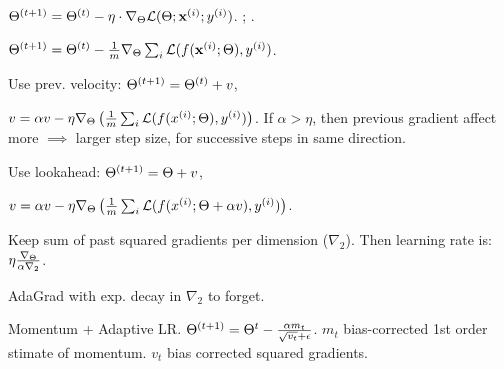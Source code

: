 \begin{definition}[SGD]
    \(\Theta^{(t+1)} = \Theta^{(t)} - \eta \cdot \nabla_\Theta \mathcal{L}(\Theta; \vb{x}^{(i)}; y^{(i)})\).
    ;
    .
\end{definition}

\begin{definition}[MB-GD]
    \(\Theta^{(t+1)} = \Theta^{(t)} - \frac 1 m \nabla_\Theta \sum_i \mathcal{L}(f(\vb{x}^{(i)}; \Theta), y^{(i)})\).
\end{definition}

\begin{definition}
    Use prev. velocity:
    \(\Theta^{(t+1)} = \Theta^{(t)} + v\), 
    
    \(v = \alpha v - \eta \nabla_\Theta\left(\frac 1 m \sum_i \mathcal{L}(f(x^{(i)}; \Theta), y^{(i)})\right)\). If \(\alpha > \eta\), then previous gradient affect more \(\implies\) larger step size, for successive steps in same direction.
\end{definition}

\begin{definition}
    Use lookahead:
    \(\Theta^{(t+1)} = \Theta + v\),
    
    \(v = \alpha v - \eta \nabla_\Theta\left(\frac 1 m \sum_i \mathcal{L}(f(x^{(i)}; \Theta + \alpha v), y^{(i)})\right)\).
\end{definition}

\begin{definition}[AdaGrad]
    Keep sum of past squared gradients per dimension (\(\nabla_2\)).
    Then learning rate is: \(\eta \frac{\nabla_\Theta}{\alpha \nabla_2} \).
\end{definition}

\begin{definition}[RMSprop]
    AdaGrad with exp. decay in \(\nabla_2\) to forget. 
\end{definition}

\begin{definition}[Adam]
    Momentum + Adaptive LR. \(\Theta^{(t+1)} = \Theta^t - \frac{\alpha m_t}{\sqrt{v_t} + \epsilon}\). \(m_t\) bias-corrected 1st order stimate of momentum. \(v_t\) bias corrected squared gradients.
\end{definition}


